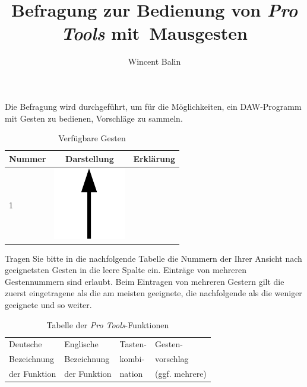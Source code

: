 \documentclass[11pt,a4paper,notitlepage]{article}
\author{Wincent Balin}
\title{Befragung zur Bedienung von \emph{Pro Tools} mit~Mausgesten}
\begin{document}
\maketitle

Die Befragung wird durchgeführt, um für die Möglichkeiten, ein DAW-Programm mit Gesten zu bedienen, Vorschläge zu sammeln.

\begin{table}[ht] \label{tab:Gestures}
\centering
\begin{tabular}{lcl} \toprule
Nummer & Darstellung & Erklärung \\ \midrule \midrule
 1 & \includegraphics[scale=0.25]{img/up} & \\ \midrule
\end{tabular}
\caption{Verfügbare Gesten}
\end{table}

Tragen Sie bitte in die nachfolgende Tabelle die Nummern der Ihrer Ansicht nach geeignetsten Gesten
in die leere Spalte ein. Einträge von mehreren Gestennummern sind erlaubt. Beim Eintragen von mehreren
Gestern gilt die zuerst eingetragene als die am meisten geeignete, die nachfolgende als die weniger geeignete
und so weiter.

\begin{table}[ht] \label{tab:Functions}
\centering
\begin{tabular}{llll} \toprule
Deutsche     & Englische    & Tasten-  & Gesten-        \\
Bezeichnung  & Bezeichnung  & kombi- & vorschlag      \\
der Funktion & der Funktion & nation     & (ggf. mehrere) \\ \midrule \midrule
\end{tabular}
\caption{Tabelle der \emph{Pro Tools}-Funktionen}
\end{table}
\end{document}

